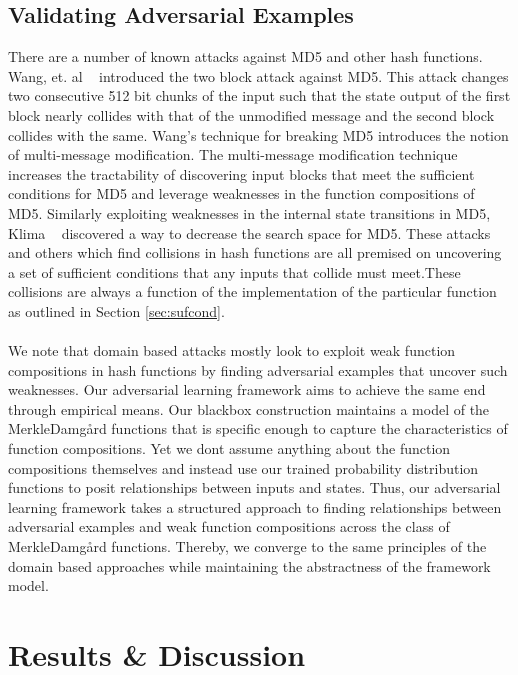 \documentclass[letterpaper,twocolumn,10pt]{article}
\begin{document}
\subsection{Validating Adversarial Examples}
There are a number of known attacks against MD5 and other hash functions. Wang, et. al ~\cite{wang2005break} introduced the two block attack against MD5. This attack changes two consecutive 512 bit chunks of the input such that the state output of the first block nearly collides with that of the unmodified message and the second block collides with the same. Wang's technique for breaking MD5 introduces the notion of multi-message modification. The multi-message modification technique increases the tractability of discovering input blocks that meet the sufficient conditions for MD5 and leverage weaknesses in the function compositions of MD5. Similarly exploiting weaknesses in the internal state transitions in MD5, Klima ~\cite{klima2005finding} discovered a way to decrease the search space for MD5. These attacks and others which find collisions in hash functions are all premised on uncovering a set of sufficient conditions that any inputs that collide must meet.These collisions are always a function of the implementation of the particular function as outlined in Section \ref{sec:sufcond}.
\\
\\
We note that domain based attacks mostly look to exploit weak function compositions in hash functions by finding adversarial examples that uncover such weaknesses. Our adversarial learning framework aims to achieve the same end through empirical means. Our blackbox construction maintains a model of the Merkle{\textendash}Damg\r{a}rd functions that is specific enough to capture the characteristics of function compositions. Yet we dont assume anything about the function compositions themselves and instead use our trained probability distribution functions to posit relationships between inputs and states. Thus, our adversarial learning framework takes a structured approach to finding relationships between adversarial examples and weak function compositions across the class of Merkle{\textendash}Damg\r{a}rd functions. Thereby, we converge to the same principles of the domain based approaches while maintaining the abstractness of the framework model. 


\section{Results \& Discussion}
\end{document}

